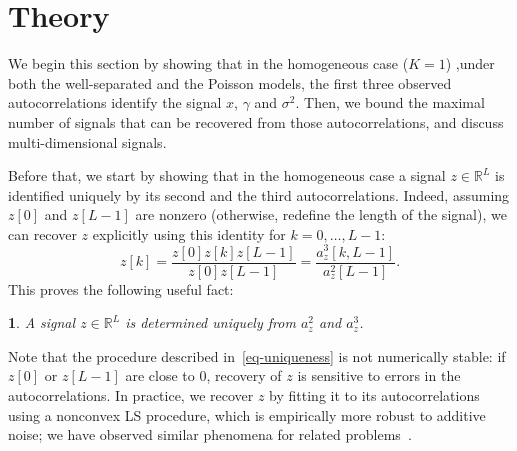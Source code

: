 \documentclass[12pt]{article}
\newcommand{\1}{\mathbf{1}}
\newcommand{\RL}{\mathbb{R}^L}
\theoremstyle{plain}
\theoremstyle{definition}
\theoremstyle{remark}
\theoremstyle{plain}
\theoremstyle{remark}
\theoremstyle{plain}
\theoremstyle{plain}
\theoremstyle{plain}
\newtheorem{proposition}[thm]{\protect\propositionname}
\providecommand{\propositionname}{Proposition}
\numberwithin{equation}{section}
\begin{document}
%

\section{Theory}

We begin this section by showing that in the homogeneous case ($K=1$) ,under both the well-separated and the Poisson models, the first three observed autocorrelations  identify the signal $x$, $\gamma$ and $\sigma^2$.  Then, we bound the maximal number of signals that can be recovered from those autocorrelations, and discuss multi-dimensional signals.

Before that, we start by showing that in the homogeneous case a signal $z\in\RL$ is identified uniquely by its second and the third autocorrelations.
 Indeed, assuming $z[0]$ and $z[L-1]$ are nonzero (otherwise, redefine the length of the signal), we can recover $z$ explicitly using this identity for $k = 0, \ldots, L-1$:
%
\begin{equation}
%
z[k]  = \frac{z[0]z[k]z[L-1]}{z[0]z[L-1]} = \frac{a_z^3[k,L-1]}{a_z^2[L-1]}.
\label{eq-uniqueness}
%
\end{equation}
This proves the following useful fact:
\begin{proposition} \label{prop:uniqueness}
	A signal $z\in\RL$ is determined uniquely from  $a_z^2$ and $a_z^3$. 
\end{proposition}

Note that the procedure described in~\eqref{eq-uniqueness} is not numerically stable: if $z[0]$ or $z[L-1]$ are close to 0, recovery of $z$ is sensitive to errors in the autocorrelations. In practice, we recover $z$ by fitting it to its autocorrelations using a nonconvex LS procedure, which is empirically more robust to additive noise; we have observed similar phenomena for related problems~\cite{bendory2017bispectrum,boumal2017heterogeneous,abbe2017multireference}.
%
\end{document}
